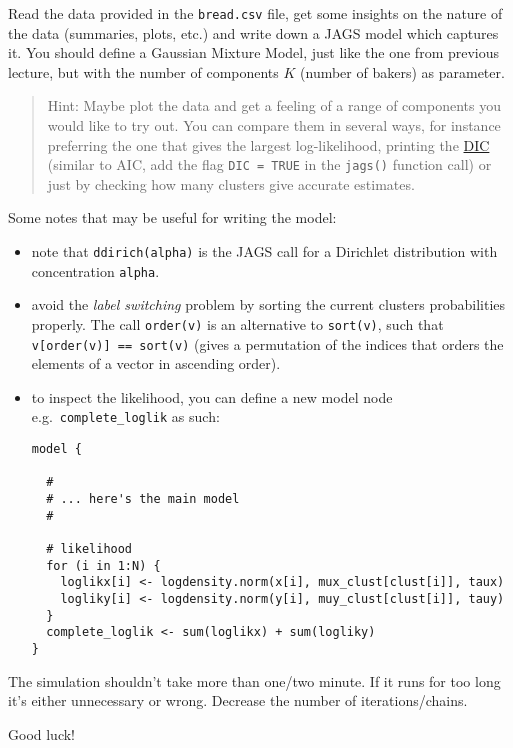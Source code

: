 \documentclass[
  oneside]{book}
\begin{document}
Read the data provided in the \texttt{bread.csv} file, get some insights
on the nature of the data (summaries, plots, etc.) and write
down a JAGS model which captures it. You should define a
Gaussian Mixture Model, just like the one from previous lecture,
but with the number of components \(K\) (number of bakers) as parameter.

\begin{quote}
Hint: Maybe plot the data and get a feeling of a range of components
you would like to try out. You can compare them in several ways, for
instance preferring the one that gives the largest log-likelihood,
printing the \href{https://en.wikipedia.org/wiki/Deviance_information_criterion}{DIC}
(similar to AIC, add the flag \texttt{DIC\ =\ TRUE} in the \texttt{jags()} function call)
or just by checking how many clusters give accurate estimates.
\end{quote}

Some notes that may be useful for writing the model:

\begin{itemize}
\item
  note that \texttt{ddirich(alpha)} is the JAGS call for a Dirichlet distribution
  with concentration \texttt{alpha}.
\item
  avoid the \emph{label switching} problem by sorting the current clusters probabilities
  properly. The call \texttt{order(v)} is an alternative to \texttt{sort(v)}, such that
  \texttt{v{[}order(v){]}\ ==\ sort(v)} (gives a permutation of the indices that orders
  the elements of a vector in ascending order).
\item
  to inspect the likelihood, you can define a new model node
  e.g.~\texttt{complete\_loglik} as such:

\begin{verbatim}
model {

  #
  # ... here's the main model
  #

  # likelihood
  for (i in 1:N) {
    loglikx[i] <- logdensity.norm(x[i], mux_clust[clust[i]], taux)
    logliky[i] <- logdensity.norm(y[i], muy_clust[clust[i]], tauy)
  }
  complete_loglik <- sum(loglikx) + sum(logliky)
}
\end{verbatim}
\end{itemize}

The simulation shouldn't take more than one/two minute. If it runs for too long it's
either unnecessary or wrong. Decrease the number of iterations/chains.

Good luck!
\end{document}
